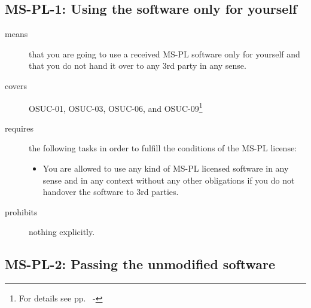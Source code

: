 \begin{center}
\begin{footnotesize}
{{{{{        }


      }
 
    }
   }   
}
\end{footnotesize}
\end{center}

\subsection{MS-PL-1: Using the software only for yourself}
\label{OSUC-01-MS-PL} 
\label{OSUC-03-MS-PL} 
\label{OSUC-06-MS-PL}
\label{OSUC-09-MS-PL}
  
\begin{description}
  \item[means] that you are going to use a received MS-PL software only for
  yourself and that you do not hand it over to any 3rd party in any sense.
  \item[covers] OSUC-01, OSUC-03, OSUC-06, and OSUC-09\footnote{For details see
  pp.\ \pageref{OSUC-01-DEF} - \pageref{OSUC-09-DEF}}
  \item[requires] the following tasks in order to fulfill the conditions of the MS-PL
  license:
  \begin{itemize}
    \item You are allowed to use any kind of MS-PL licensed software in any
    sense and in any context without any other obligations if you do not
    handover the software to 3rd parties.
  \end{itemize}
\item[prohibits] nothing explicitly.
\end{description}


\subsection{MS-PL-2: Passing the unmodified software}
\label{OSUC-02-MS-PL} \label{OSUC-05-MS-PL} \label{OSUC-07-MS-PL} 

